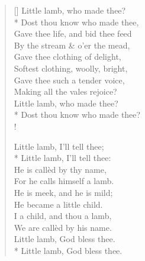 \documentclass[MAIN]{subfiles}
\begin{document}
\settowidth{\versewidth}{Gave thee life, and bid thee feed}
\begin{verse}[\versewidth]
Little lamb, who made thee?\\*
Dost thou know who made thee,\\
Gave thee life, and bid thee feed\\
By the stream \& o'er the mead,\\
Gave thee clothing of delight,\\
Softest clothing, woolly, bright,\\
Gave thee such a tender voice,\\
Making all the vales rejoice?\\
Little lamb, who made thee?\\*
Dost thou know who made thee?\\!

Little lamb, I'll tell thee;\\*
Little lamb, I'll tell thee:\\
He is call\`ed by thy name,\\
For he calls himself a lamb.\\
He is meek, and he is mild;\\
He became a little child.\\
I a child, and thou a lamb,\\
We are call\`ed by his name.\\
Little lamb, God bless thee.\\*
Little lamb, God bless thee.
\end{verse}
\end{document}
